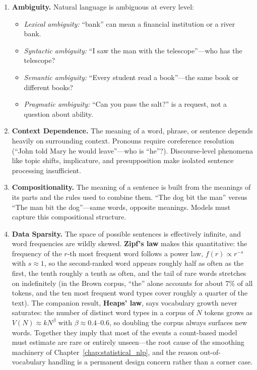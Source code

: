 \begin{enumerate}[label=\textbf{\arabic*.}]
    \item \textbf{Ambiguity.} Natural language is ambiguous at every level:
    \begin{itemize}
        \item \emph{Lexical ambiguity:} ``bank'' can mean a financial institution or a river
              bank.
        \item \emph{Syntactic ambiguity:} ``I saw the man with the telescope''---who has the
              telescope?
        \item \emph{Semantic ambiguity:} ``Every student read a book''---the same book or
              different books?
        \item \emph{Pragmatic ambiguity:} ``Can you pass the salt?'' is a request, not a
              question about ability.
    \end{itemize}

    \item \textbf{Context Dependence.} The meaning of a word, phrase, or sentence depends
    heavily on surrounding context. Pronouns require coreference resolution (``John told
    Mary he would leave''---who is ``he''?). Discourse-level phenomena like topic shifts,
    implicature, and presupposition make isolated sentence processing insufficient.

    \item \textbf{Compositionality.} The meaning of a sentence is built from the meanings of
    its parts and the rules used to combine them. ``The dog bit the man'' versus ``The man
    bit the dog''---same words, opposite meanings. Models must capture this compositional
    structure.

    \item \textbf{Data Sparsity.} The space of possible sentences is effectively infinite,
    and word frequencies are wildly skewed. \textbf{Zipf's law} makes this quantitative:
    the frequency of the $r$-th most frequent word follows a power law,
    $f(r) \propto r^{-s}$ with $s \approx 1$, so the second-ranked word appears roughly
    half as often as the first, the tenth roughly a tenth as often, and the tail of rare
    words stretches on indefinitely (in the Brown corpus, ``the'' alone accounts for about
    7\% of all tokens, and the ten most frequent word types cover roughly a quarter of the
    text). The companion result, \textbf{Heaps' law}, says vocabulary growth never
    saturates: the number of distinct word types in a corpus of $N$ tokens grows as
    $V(N) \approx k N^{\beta}$ with $\beta \approx 0.4$--$0.6$, so doubling the corpus
    always surfaces new words. Together they imply that most of the events a count-based
    model must estimate are rare or entirely unseen---the root cause of the smoothing
    machinery of Chapter~\ref{chap:statistical_nlp}, and the reason out-of-vocabulary
    handling is a permanent design concern rather than a corner case.


\end{enumerate}
